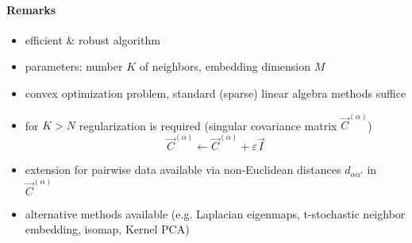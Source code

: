 \paragraph{Remarks}
\small
\begin{itemize}
	\item efficient \& robust algorithm
	\vspace{0.2cm}
	\item parameters: number $K$ of neighbors, embedding dimension $M$
	\vspace{0.2cm}
	\item convex optimization problem, standard (sparse) linear algebra methods suffice 
	\vspace{0.2cm}
	\item for $K > N$ regularization is required (singular covariance matrix $\vec{C}^{(\alpha)}$)
	\vspace{-0.1cm}
	\begin{equation*}
		\vec{C}^{(\alpha)} \leftarrow \vec{C}^{(\alpha)} + \varepsilon \vec{I}
	\end{equation*} 
	\vspace{-0.7cm}
	\item extension for pairwise data available via non-Euclidean distances $d_{\alpha \alpha'}$ in $\vec{C}^{(\alpha)}$
	\vspace{0.2cm}
	\item alternative methods available (e.g. Laplacian eigenmaps, t-stochastic neighbor embedding, isomap, Kernel PCA)
\end{itemize}
